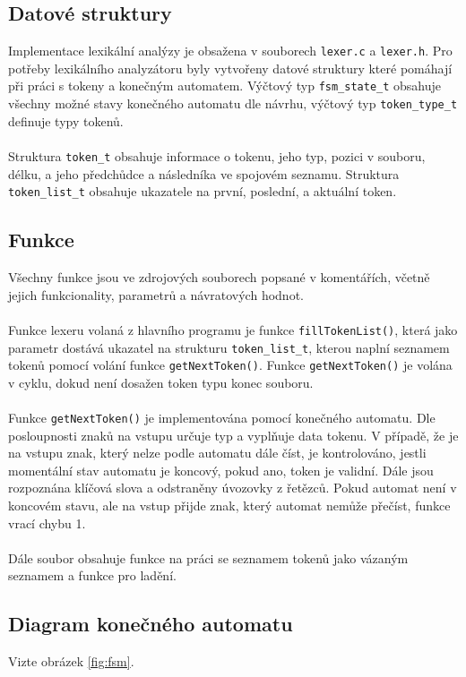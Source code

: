 \documentclass[11pt,a4paper]{article}
\begin{document}
    \subsection{Datové struktury}
    Implementace lexikální analýzy je obsažena v souborech \verb|lexer.c| a \verb|lexer.h|.
    Pro potřeby lexikálního analyzátoru byly vytvořeny datové struktury které pomáhají při
    práci s tokeny a konečným automatem. Výčtový typ \verb|fsm_state_t| obsahuje všechny možné
    stavy konečného automatu dle návrhu, výčtový typ \verb|token_type_t| definuje typy tokenů.
    \\ \\
    Struktura \verb|token_t| obsahuje informace o tokenu, jeho typ, pozici v souboru, délku,
    a jeho předchůdce a následníka ve spojovém seznamu. Struktura \verb|token_list_t| obsahuje
    ukazatele na první, poslední, a aktuální token.

    \subsection{Funkce}

    Všechny funkce jsou ve zdrojových souborech popsané v komentářích, včetně jejich funkcionality, parametrů a návratových hodnot.
    \\ \\
    Funkce lexeru volaná z hlavního programu je funkce \verb|fillTokenList()|, která jako parametr
    dostává ukazatel na strukturu \verb|token_list_t|, kterou naplní seznamem tokenů pomocí volání
    funkce \verb|getNextToken()|. Funkce \verb|getNextToken()| je volána v cyklu, dokud není dosažen token
    typu konec souboru.
    \\ \\
    Funkce \verb|getNextToken()| je implementována pomocí konečného automatu. Dle posloupnosti znaků na vstupu
    určuje typ a vyplňuje data tokenu. V případě, že je na vstupu znak, který nelze podle automatu dále číst,
    je kontrolováno, jestli momentální stav automatu je koncový, pokud ano, token je validní.
    Dále jsou rozpoznána klíčová slova a odstraněny úvozovky z řetězců. Pokud automat není v koncovém stavu,
    ale na vstup přijde znak, který automat nemůže přečíst, funkce vrací chybu 1.
    \\ \\
    Dále soubor obsahuje funkce na práci se seznamem tokenů jako vázaným seznamem a funkce pro ladění.

    \subsection{Diagram konečného automatu}
    Vizte obrázek \ref{fig:fsm}.
    
\end{document}
